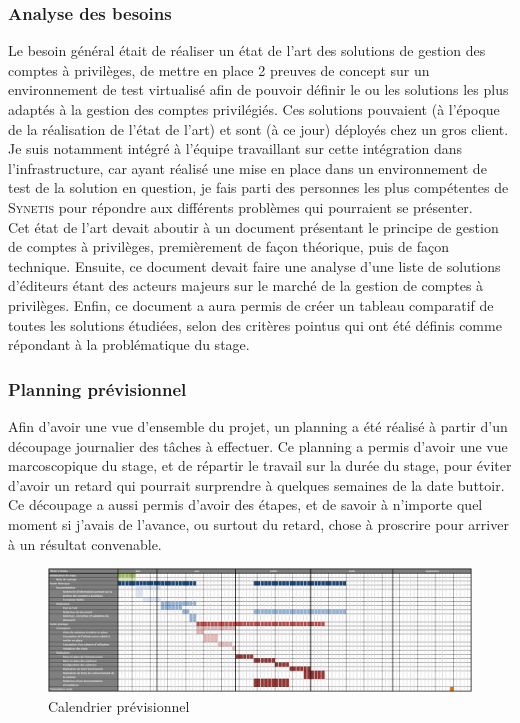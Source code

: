\subsubsection{Analyse des besoins}
\label{besoins}
Le besoin général était de réaliser un état de l'art des solutions de gestion des comptes à privilèges, de mettre en place 2 preuves de concept sur un environnement de test virtualisé afin de pouvoir définir le ou les solutions les plus adaptés à la gestion des comptes privilégiés. Ces solutions pouvaient (à l'époque de la réalisation de l'état de l'art) et sont (à ce jour) déployés chez un gros client. Je suis notamment intégré à l'équipe travaillant sur cette intégration dans l'infrastructure, car ayant réalisé une mise en place dans un environnement de test de la solution en question, je fais parti des personnes les plus compétentes de \textsc{Synetis} pour répondre aux différents problèmes qui pourraient se présenter.\\
Cet état de l'art devait aboutir à un document présentant le principe de gestion de comptes à privilèges, premièrement de façon théorique, puis de façon technique. Ensuite, ce document devait faire une analyse d'une liste de solutions d'éditeurs étant des acteurs majeurs sur le marché de la gestion de comptes à privilèges. Enfin, ce document a aura permis de créer un tableau comparatif de toutes les solutions étudiées, selon des critères pointus qui ont été définis comme répondant à la problématique du stage.

\subsubsection{Planning prévisionnel}
\label{planning}
Afin d'avoir une vue d'ensemble du projet, un planning a été réalisé à partir d'un découpage journalier des tâches à effectuer. Ce planning a permis d'avoir une vue marcoscopique du stage, et de répartir le travail sur la durée du stage, pour éviter d'avoir un retard qui pourrait surprendre à quelques semaines de la date buttoir. Ce découpage a aussi permis d'avoir des étapes, et de savoir à n'importe quel moment si j'avais de l'avance, ou surtout du retard, chose à proscrire pour arriver à un résultat convenable.\\
\begin{figure}[!ht]
    \center
    \includegraphics[width=\textwidth]{./images/calendrier_previsionnel.png}
    \caption{Calendrier prévisionnel}
\end{figure}

